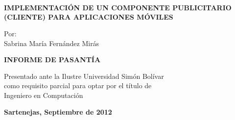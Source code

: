 \begin{center}
\par\end{center}

\noindent \begin{center}
\textbf{}\textbf{\noun{}}\\
\textbf{}\\
\textbf{}\noun{}\\
\bigskip{}
\bigskip{}
\bigskip{}
\bigskip{}
\bigskip{}
\bigskip{}
\bigskip{}
\bigskip{}
\bigskip{}
\bigskip{}
\bigskip{}
\bigskip{}

\par\end{center}

\noindent \begin{center}
\textbf{\large IMPLEMENTACIÓN DE UN COMPONENTE PUBLICITARIO (CLIENTE)
PARA APLICACIONES MÓVILES}
\par\end{center}{\large \par}

\bigskip{}
\bigskip{}
\bigskip{}
\bigskip{}
\bigskip{}
\bigskip{}


\begin{center}
Por:\\
Sabrina María Fernández Mirás
\par\end{center}

\bigskip{}
\bigskip{}


\bigskip{}
\bigskip{}
\bigskip{}
\bigskip{}
\bigskip{}
\bigskip{}


\begin{center}
\textbf{\large INFORME DE PASANTÍA}
\par\end{center}{\large \par}

\begin{center}
Presentado ante la Ilustre Universidad Simón Bolívar\\
como requisito parcial para optar por el título de\\
Ingeniero en Computación
\par\end{center}

\bigskip{}
\bigskip{}
\bigskip{}
\bigskip{}
\bigskip{}
\bigskip{}
\bigskip{}
\bigskip{}


\vfill{}


\begin{center}
\textbf{Sartenejas, Septiembre de 2012}
\par\end{center}
